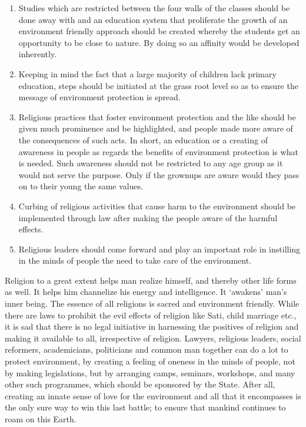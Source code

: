 \begin{multicols}{2}
\begin{enumerate}[label=$\bullet$]
\item Studies which are restricted between the four walls of the classes should be done away
with and an education system that proliferate the growth of an environment friendly
approach should be created whereby the students get an opportunity to be close to
nature. By doing so an affinity would be developed inherently.

\item Keeping in mind the fact that a large majority of children lack primary education, steps
should be initiated at the grass root level so as to ensure the message of environment
protection is spread.

\item Religious practices that foster environment protection and the like should be given
much prominence and be highlighted, and people made more aware of the
consequences of such acts. In short, an education or a creating of awareness in people
as regards the benefits of environment protection is what is needed. Such awareness
should not be restricted to any age group as it would not serve the purpose. Only if the
grownups are aware would they pass on to their young the same values.

\item Curbing of religious activities that cause harm to the environment should be implemented through law after making the people aware of the harmful effects.

\item Religious leaders should come forward and play an important role in instilling in the
minds of people the need to take care of the environment.
\end{enumerate}


\noi
Religion to a great extent helps man realize himself, and thereby other life forms as well. It
helps him channelize his energy and intelligence. It ‘awakens’ man’s inner being. The essence
of all religions is sacred and environment friendly. While there are laws to prohibit the evil
effects of religion like Sati, child marriage etc., it is sad that there is no legal initiative in
harnessing the positives of religion and making it available to all, irrespective of religion.
Lawyers, religious leaders, social reformers, academicians, politicians and common man
together can do a lot to protect environment, by creating a feeling of oneness in the minds of
people, not by making legislations, but by arranging camps, seminars, workshops, and many
other such programmes, which should be sponsored by the State. After all, creating an innate
sense of love for the environment and all that it encompasses is the only sure way to win this
last battle; to ensure that mankind continues to roam on this Earth.
\end{multicols}
	
